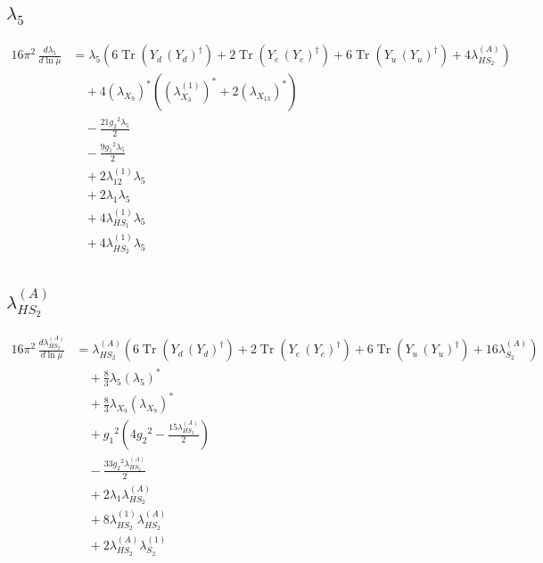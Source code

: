 \documentclass[10pt,a4paper]{article}
\begin{document}
\subsection*{$\lambda_5$}
\begin{align*}
16\pi^2\,\frac{d \lambda_5}{d\ln\mu} &={\lambda_5} (6 \operatorname{Tr}\!\left({Y_d}\,\left({Y_d}\right)^{\dagger}\right)+2 \operatorname{Tr}\!\left({Y_e}\,\left({Y_e}\right)^{\dagger}\right)+6 \operatorname{Tr}\!\left({Y_u}\,\left({Y_u}\right)^{\dagger}\right)+4 {\lambda_{HS_2}^{(A)}}) \\
&\quad +4 \left({\lambda_{X_{9}}}\right)^{*} (\left({\lambda_{X_{3}}^{(1)}}\right)^{*}+2 \left({\lambda_{X_{13}}}\right)^{*}) \\
&\quad -\frac{21 {g_2}^2 {\lambda_5}}{2} \\
&\quad -\frac{9 {g_1}^2 {\lambda_5}}{2} \\
&\quad +2 {\lambda_{12}^{(1)}} {\lambda_5} \\
&\quad +2 {\lambda_1} {\lambda_5} \\
&\quad +4 {\lambda_{HS_1}^{(1)}} {\lambda_5} \\
&\quad +4 {\lambda_{HS_2}^{(1)}} {\lambda_5} \\
\end{align*}
\subsection*{$\lambda_{HS_2}^{(A)}$}
\begin{align*}
16\pi^2\,\frac{d \lambda_{HS_2}^{(A)}}{d\ln\mu} &={\lambda_{HS_2}^{(A)}} (6 \operatorname{Tr}\!\left({Y_d}\,\left({Y_d}\right)^{\dagger}\right)+2 \operatorname{Tr}\!\left({Y_e}\,\left({Y_e}\right)^{\dagger}\right)+6 \operatorname{Tr}\!\left({Y_u}\,\left({Y_u}\right)^{\dagger}\right)+16 {\lambda_{S_2}^{(A)}}) \\
&\quad +\frac{8}{3} {\lambda_5} \left({\lambda_5}\right)^{*} \\
&\quad +\frac{8}{3} {\lambda_{X_{9}}} \left({\lambda_{X_{9}}}\right)^{*} \\
&\quad +{g_1}^2 \left(4 {g_2}^2-\frac{15 {\lambda_{HS_2}^{(A)}}}{2}\right) \\
&\quad -\frac{33 {g_2}^2 {\lambda_{HS_2}^{(A)}}}{2} \\
&\quad +2 {\lambda_1} {\lambda_{HS_2}^{(A)}} \\
&\quad +8 {\lambda_{HS_2}^{(1)}} {\lambda_{HS_2}^{(A)}} \\
&\quad +2 {\lambda_{HS_2}^{(A)}} {\lambda_{S_2}^{(1)}} \\
\end{align*}
\end{document}
